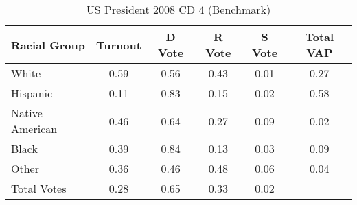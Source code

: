 \begin{table}[htb]
\begin{center}
\caption{US President 2008 CD 4 (Benchmark)}
\label{pres08_vap_cd_4_benchmark}
\begin{tabular}{lccccc}
  \hline
Racial Group & Turnout & D Vote & R Vote & S Vote & Total VAP \\ 
  \hline
White & 0.59 & 0.56 & 0.43 & 0.01 & 0.27 \\ 
  Hispanic & 0.11 & 0.83 & 0.15 & 0.02 & 0.58 \\ 
  Native American & 0.46 & 0.64 & 0.27 & 0.09 & 0.02 \\ 
  Black & 0.39 & 0.84 & 0.13 & 0.03 & 0.09 \\ 
  Other & 0.36 & 0.46 & 0.48 & 0.06 & 0.04 \\ 
  Total Votes & 0.28 & 0.65 & 0.33 & 0.02 &  \\ 
   \hline
\end{tabular}
\end{center}
\end{table}
